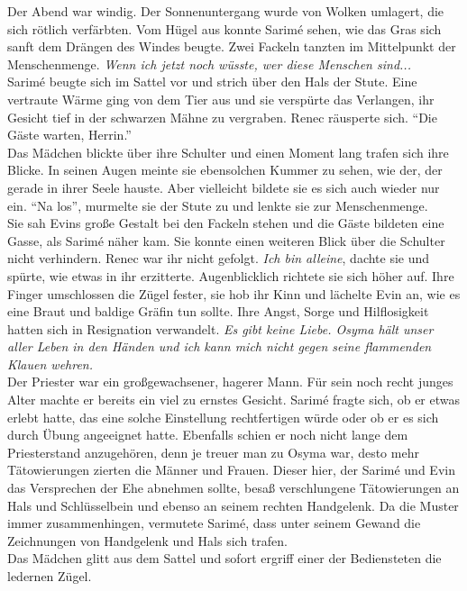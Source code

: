 Der Abend war windig. Der Sonnenuntergang wurde von Wolken umlagert, die sich rötlich verfärbten. 
Vom Hügel aus konnte Sarimé sehen, wie das Gras sich sanft dem Drängen des Windes beugte. Zwei 
Fackeln tanzten im Mittelpunkt der Menschenmenge. \textit{Wenn ich jetzt noch wüsste, wer diese 
Menschen sind...}\\
Sarimé beugte sich im Sattel vor und strich über den Hals der Stute. Eine vertraute Wärme ging von 
dem Tier aus und sie verspürte das Verlangen, ihr Gesicht tief in der schwarzen Mähne zu vergraben.
Renec räusperte sich. ``Die Gäste warten, Herrin.''\\
Das Mädchen blickte über ihre Schulter und einen Moment lang trafen sich ihre Blicke. In seinen 
Augen meinte sie ebensolchen Kummer zu sehen, wie der, der gerade in ihrer Seele hauste. Aber 
vielleicht bildete sie es sich auch wieder nur ein. ``Na los'', murmelte sie der Stute zu und 
lenkte sie zur Menschenmenge.\\
Sie sah Evins große Gestalt bei den Fackeln stehen und die Gäste bildeten eine Gasse, als Sarimé 
näher kam. Sie konnte einen weiteren Blick über die Schulter nicht verhindern. Renec war ihr nicht 
gefolgt. \textit{Ich bin alleine}, dachte sie und spürte, wie etwas in ihr erzitterte.
Augenblicklich richtete sie sich höher auf. Ihre Finger umschlossen die Zügel fester, sie hob ihr 
Kinn und lächelte Evin an, wie es eine Braut und baldige Gräfin tun sollte. Ihre Angst, Sorge und 
Hilflosigkeit hatten sich in Resignation verwandelt. \textit{Es gibt keine Liebe. Osyma hält unser 
aller Leben in den Händen und ich kann mich nicht gegen seine flammenden Klauen wehren.}\\
Der Priester war ein großgewachsener, hagerer Mann. Für sein noch recht junges Alter machte er 
bereits ein viel zu ernstes Gesicht. Sarimé fragte sich, ob er etwas erlebt hatte, das eine solche 
Einstellung rechtfertigen würde oder ob er es sich durch Übung angeeignet hatte. Ebenfalls schien 
er noch nicht lange dem Priesterstand anzugehören, denn je treuer man zu Osyma war, desto mehr 
Tätowierungen zierten die Männer und Frauen. Dieser hier, der Sarimé und Evin das Versprechen der 
Ehe abnehmen sollte, besaß verschlungene Tätowierungen an Hals und Schlüsselbein und ebenso an 
seinem rechten Handgelenk. Da die Muster immer zusammenhingen, vermutete Sarimé, dass unter seinem 
Gewand die Zeichnungen von Handgelenk und Hals sich trafen.\\ 
Das Mädchen glitt aus dem Sattel und sofort ergriff einer der Bediensteten die ledernen Zügel. 

